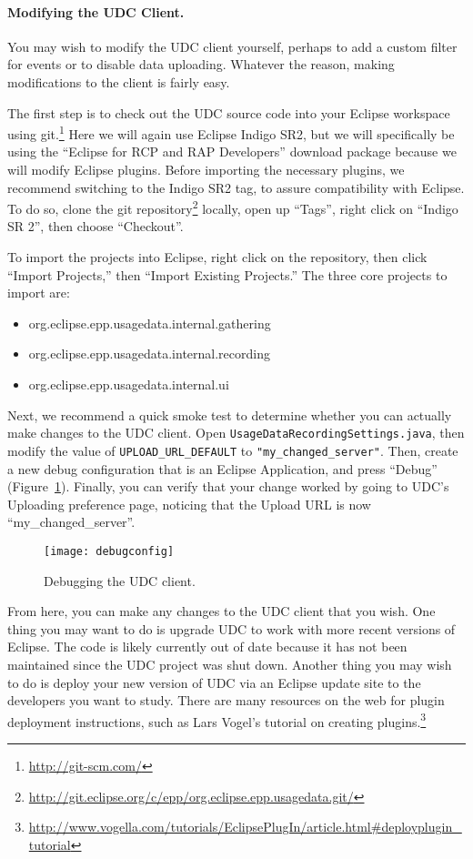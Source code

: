 \paragraph{Modifying the UDC Client.}

You may wish to modify the UDC client yourself, perhaps to add a custom filter for events
or to disable data uploading.
Whatever the reason, making modifications to the client is fairly easy.

The first step is to check out the UDC source code into your Eclipse
workspace using git.\footnote{\url{http://git-scm.com/}}
Here we will again use Eclipse Indigo SR2, but we will specifically be using the
``Eclipse for RCP and RAP Developers'' download package because we will
modify Eclipse plugins.
Before importing the necessary plugins, we recommend switching to
the Indigo SR2 tag, to assure compatibility with
Eclipse.
To do so, clone the git repository\footnote{\url{http://git.eclipse.org/c/epp/org.eclipse.epp.usagedata.git/}}
locally, open up ``Tags'', right click on ``Indigo SR 2'',
then choose ``Checkout''.

To import the projects into Eclipse, right click on the repository, then click
``Import Projects,'' then ``Import Existing Projects.''
The three core projects to import are:

\begin{itemize}
\item org.eclipse.epp.usagedata.internal.gathering
\item org.eclipse.epp.usagedata.internal.recording
\item org.eclipse.epp.usagedata.internal.ui
\end{itemize}

Next, we recommend a quick smoke test to determine whether you
can actually make changes to the UDC client.
Open \texttt{UsageDataRecordingSettings.java}, then modify the value of \texttt{UPLOAD\_URL\_DEFAULT}
to \texttt{"my\_changed\_server"}.
Then, create a new debug configuration that is an Eclipse Application, and press
``Debug'' (Figure~\ref{fig:debugconfig}).
Finally, you can verify that your change worked by going to UDC's Uploading
preference page, noticing that the Upload URL is now ``my\_changed\_server''.

\begin{figure}
  \centering
  \texttt{[image: debugconfig]}
  \caption{Debugging the UDC client.}\label{fig:debugconfig}
\end{figure}

From here, you can make any changes to the UDC client that you wish.
One thing you may want to do is upgrade UDC to work with more recent versions
of Eclipse.
The code is likely currently out of date
because it has not been maintained since the UDC project was shut down.
Another thing you may wish to do is deploy your new version of UDC via
an Eclipse update site to the developers you want to study.
There are many resources on the web for plugin deployment instructions,
such as Lars Vogel's tutorial on creating
plugins.\footnote{\url{http://www.vogella.com/tutorials/EclipsePlugIn/article.html#deployplugin_tutorial}}

